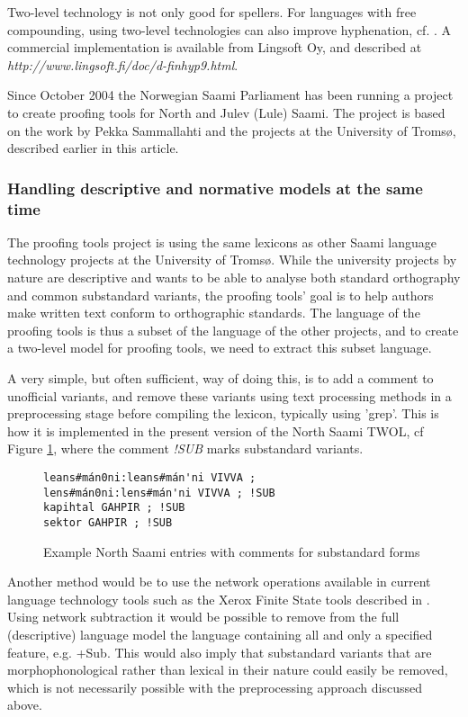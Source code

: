 \documentclass[a4paper,english]{article}
\begin{document}
Two-level technology is not only good for spellers. For languages with free compounding, using two-level technologies can also improve hyphenation, cf. \cite{Karlsson85}. A commercial implementation is available from Lingsoft Oy, and described at \textit{http://www.lingsoft.fi/doc/d-finhyp9.html}.

Since October 2004 the Norwegian Saami Parliament has been running a project to create proofing tools for North and Julev (Lule) Saami. The project is based on the work by Pekka Sammallahti and the projects at the University of Tromsø, described earlier in this article.

\subsubsection{Handling descriptive and normative models at the same time}

The proofing tools project is using the same lexicons as other Saami language technology projects at the University of Tromsø. While the university projects by nature are descriptive and wants to be able to analyse both standard orthography and common substandard variants, the proofing tools' goal is to help authors make written text conform to orthographic standards. The language of the proofing tools is thus a subset of the language of the other projects, and to create a two-level model for proofing tools, we need to extract this subset language.

A very simple, but often sufficient, way of doing this, is to add a comment to unofficial variants, and remove these variants using text processing methods in a preprocessing stage before compiling the lexicon, typically using 'grep'. This is how it is implemented in the present version of the North Saami TWOL, cf Figure \ref{sublex}, where the comment \textit{!SUB} marks  substandard variants.

\begin{figure}[htbp]
\begin{center}
\begin{verbatim}
leans#mán0ni:leans#mán'ni VIVVA ;
lens#mán0ni:lens#mán'ni VIVVA ; !SUB
kapihtal GAHPIR ; !SUB
sektor GAHPIR ; !SUB
\end{verbatim}
\caption{Example North Saami entries with comments for substandard forms}
\label{sublex}
\end{center}
\end{figure}

Another method would be to use the network operations available in current language technology tools such as the Xerox Finite State tools described in \cite{Beesley03}. Using network subtraction it would be possible to remove from the full (descriptive) language model the language containing all and only a specified feature, e.g. +Sub. This would also imply that substandard variants that are morphophonological rather than lexical in their nature could easily be removed, which is not necessarily possible with the preprocessing approach discussed above.
\end{document}
